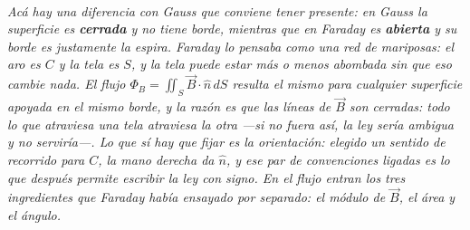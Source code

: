 \begin{center}
\begin{tikzpicture}[scale=1]
\end{tikzpicture}\\[0.5em]
{\small\itshape Acá hay una diferencia con Gauss que conviene tener presente:
en Gauss la superficie es \textbf{cerrada} y no tiene borde, mientras que en
Faraday es \textbf{abierta} y su borde es justamente la espira. Faraday lo
pensaba como una red de mariposas: el aro es $C$ y la tela es $S$, y la tela
puede estar más o menos abombada sin que eso cambie nada. El flujo
$\Phi_B = \iint_S \vec B\cdot\hat n\,dS$ resulta el mismo para cualquier
superficie apoyada en el mismo borde, y la razón es que las líneas de $\vec B$
son cerradas: todo lo que atraviesa una tela atraviesa la otra ---si no fuera
así, la ley sería ambigua y no serviría---. Lo que sí hay que fijar es la
orientación: elegido un sentido de recorrido para $C$, la mano derecha da
$\hat n$, y ese par de convenciones ligadas es lo que después permite escribir
la ley con signo. En el flujo entran los tres ingredientes que Faraday había
ensayado por separado: el módulo de $\vec B$, el área y el ángulo.}
\end{center}
